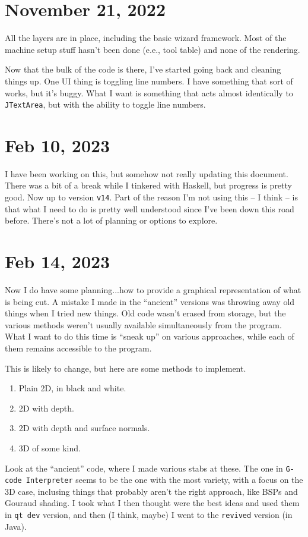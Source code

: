 \documentclass{article}
\begin{document}
\section{November 21, 2022}

All the layers are in place, including the basic wizard
framework. Most of the machine setup stuff hasn't been done (e.e., tool
table) and none of the rendering.

Now that the bulk of the code is there, I've started going back and
cleaning things up. One UI thing is toggling line numbers. I have
something that sort of works, but it's buggy. What I want is something
that acts almost identically to {\tt JTextArea}, but with the ability
to toggle line numbers.

\section{Feb 10, 2023}

I have been working on this, but somehow not really updating this
document. There was a bit of a break while I tinkered with Haskell,
but progress is pretty good. Now up to version {\tt v14}. Part of
the reason I'm not using this -- I think -- is that what I need to do
is pretty well understood since I've been down this road
before. There's not a lot of planning or options to explore.

\section{Feb 14, 2023}

Now I do have some planning...how to provide a graphical
representation of what is being cut. A mistake I made in the
``ancient'' versions was throwing away old things when I tried new
things. Old code wasn't erased from storage, but the various methods
weren't usually available simultaneously from the program. What I want
to do this time is ``sneak up'' on various approaches, while each of
them remains accessible to the program.

This is likely to change, but here are some methods to implement.
\begin{enumerate}
\item Plain 2D, in black and white.
\item 2D with depth.
\item 2D with depth and surface normals.
\item 3D of some kind.
\end{enumerate}
Look at the ``ancient'' code, where I made various stabs at these. The
one in {\tt G-code Interpreter} seems to be the one with the most
variety, with a focus on the 3D case, inclusing things that probably
aren't the right approach, like BSPs and Gouraud shading. I took what
I then thought were the best ideas and used them in {\tt qt dev}
version, and then (I think, maybe) I went to the {\tt   revived}
version (in Java).
\end{document}
